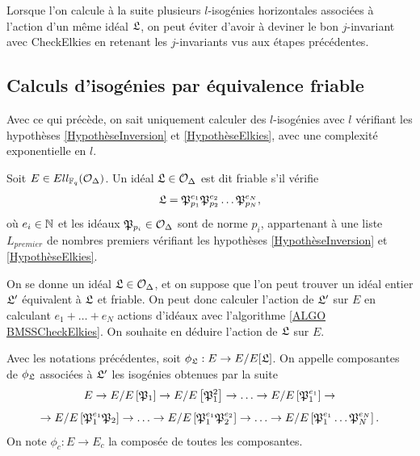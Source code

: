 \begin{Rem}
	Lorsque l'on calcule à la suite plusieurs $l$-isogénies horizontales associées à l'action d'un même idéal $\mathfrak{L}$, on peut éviter d'avoir à deviner le bon $j$-invariant avec CheckElkies en retenant les $j$-invariants vus aux étapes précédentes.  
\end{Rem}

\subsection{Calculs d'isogénies par équivalence friable}\label{SECTION isogenieFriable}

Avec ce qui précède, on sait uniquement calculer des $l$-isogénies avec $l$ vérifiant les hypothèses \ref{HypothèseInversion} et \ref{HypothèseElkies}, avec une complexité exponentielle en $l$. 

\begin{Def}
	Soit $E\in Ell_{\mathbb{F}_{q}}(\mathcal{O}_{\Delta})$. Un idéal $\mathfrak{L}\in\mathcal{O}_{\Delta}$ est dit friable s'il vérifie 
	\begin{equation*}
		\mathfrak{L} = \mathfrak{P}_{p_{1}}^{e_{1}}\mathfrak{P}_{p_{2}}^{e_{2}}\ldots\mathfrak{P}_{p_{N}}^{e_{N}},
	\end{equation*} 
	où $e_{i}\in\mathbb{N}$ et les idéaux $\mathfrak{P}_{p_{i}}\in\mathcal{O}_{\Delta}$ sont de norme $p_{i}$, appartenant à une liste $L_{premier}$ de nombres premiers vérifiant les hypothèses \ref{HypothèseInversion} et \ref{HypothèseElkies}.
\end{Def}

On se donne un idéal $\mathfrak{L}\in\mathcal{O}_{\Delta}$, et on suppose que l'on peut trouver un idéal entier $\mathfrak{L}'$ équivalent à $\mathfrak{L}$ et friable. On peut donc calculer l'action de $\mathfrak{L}'$ sur $E$ en calculant $e_1 + \ldots + e_N$ actions d'idéaux avec l'algorithme \ref{ALGO BMSSCheckElkies}. On souhaite en déduire l'action de $\mathfrak{L}$ sur $E$. 

\begin{Def}
	 Avec les notations précédentes, soit $\phi_{\mathfrak{L}} : E \rightarrow E/E[\mathfrak{L}]$. On appelle composantes de $\phi_{\mathfrak{L}}$ associées à $\mathfrak{L}'$ les isogénies obtenues par la suite
	\begin{equation*}
		E\rightarrow E/E\left[ \mathfrak{P}_{1}\right] \rightarrow E/E\left[ \mathfrak{P}_{1}^{2}\right] \rightarrow\ldots\rightarrow E/E\left[ \mathfrak{P}_{1}^{e_{1}}\right] \rightarrow
	\end{equation*}
	\begin{equation*}
		\rightarrow E/E\left[ \mathfrak{P}_{1}^{e_{1}}\mathfrak{P}_{2}\right] \rightarrow\ldots\rightarrow E/E\left[ \mathfrak{P}_{1}^{e_{1}}\mathfrak{P}_{2}^{e_{2}}\right] \rightarrow\ldots\rightarrow E/E\left[\mathfrak{P}_{1}^{e_{1}} \ldots\mathfrak{P}_{N}^{e_{N}}\right].
	\end{equation*}
	On note $\phi_c : E\rightarrow E_c$ la composée de toutes les composantes.
\end{Def}

